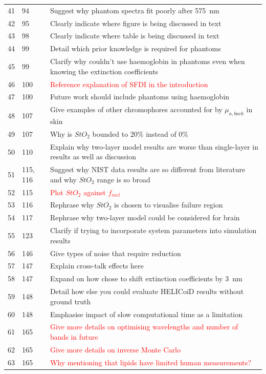 \documentclass{article}
\begin{document}
\begin{table}
\begin{tabular}{|p{1.5cm}|p{2cm}|p{7.5cm}|}
        41 & 94 & Suggest why phantom spectra fit poorly after 575~nm \\
        42 & 95 & Clearly indicate where figure is being discussed in text \\
        43 & 98 & Clearly indicate where table is being discussed in text \\ 
        44 & 99 & Detail which prior knowledge is required for phantoms \\
        45 & 99 & Clarify why couldn't use haemoglobin in phantoms even when knowing the extinction coefficients \\
        46 & 100 & \textcolor{red}{Reference explanation of SFDI in the introduction} \\
        47 & 100 & Future work should include phantoms using haemoglobin \\
        48 & 107 & Give examples of other chromophores accounted for by $\mu_{a, back}$ in skin \\
        49 & 107 & Why is $StO_2$ bounded to 20\% instead of 0\% \\
        50 & 110 & Explain why two-layer model results are worse than single-layer in results as well as discussion \\
        51 & 115, 116 & Suggest why NIST data results are so different from literature and why $StO_2$ range is so broad \\
        52 & 115 & \textcolor{red}{Plot $StO_2$ against $f_{mel}$} \\
        53 & 116 & Rephrase why $StO_2$ is chosen to visualise failure region \\
        54 & 117 & Rephrase why two-layer model could be considered for brain \\
        55 & 123 & Clarify if trying to incorporate system parameters into simulation results \\
        56 & 146 & Give types of noise that require reduction \\
        57 & 147 & Explain cross-talk effects here \\
        58 & 147 & Expand on how chose to shift extinction coefficients by 3~nm \\
        59 & 148 & Detail how else you could evaluate HELICoiD results without ground truth \\
        60 & 148 & Emphasise impact of slow computational time as a limitation \\
        61 & 165 & \textcolor{red}{Give more details on optimising wavelengths and number of bands in future} \\
        62 & 165 & \textcolor{red}{Give more details on inverse Monte Carlo} \\
        63 & 165 & \textcolor{red}{Why mentioning that lipids have limited human measurements?} \\
        \hline
    \end{tabular}
\end{table}
\end{document}
